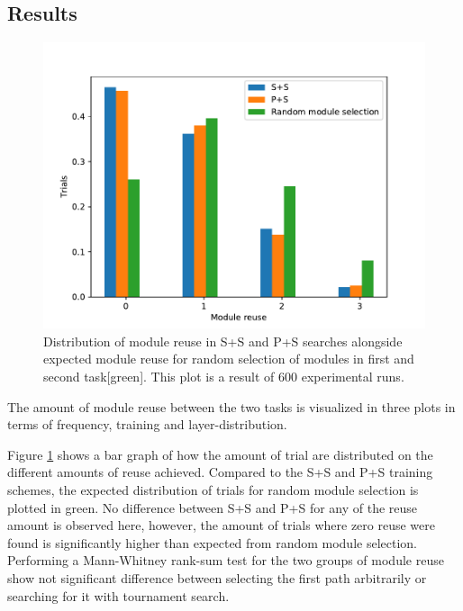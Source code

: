 \subsection{Results}
\label{exp1:BIN.results}
\begin{figure}[t]
    \includegraphics[width=\textwidth]{Chapters/4.Experiments/exp1/figures/BIN_module_reuse_bargraph.pdf}
    \caption[Module reuse for binary MNIST classification]{Distribution of module reuse in S+S and P+S searches alongside expected module reuse for random selection of modules in first and second task[green]. This plot is a result of 600 experimental runs.}
    \label{fig:binMNIST.hist}
\end{figure}

The amount of module reuse between the two tasks is visualized in three plots in terms of frequency, training and layer-distribution.

Figure \ref{fig:binMNIST.hist} shows a bar graph of how the amount of trial are distributed on the different amounts of reuse achieved. Compared to the S+S and P+S training schemes, the expected distribution of trials for random module selection is plotted in green. No difference between S+S and P+S for any of the reuse amount is observed here, however, the amount of trials where zero reuse were found is significantly higher than expected from random module selection. Performing a Mann-Whitney rank-sum test for the two groups of module reuse show not significant difference between selecting the first path arbitrarily or searching for it with tournament search. 

